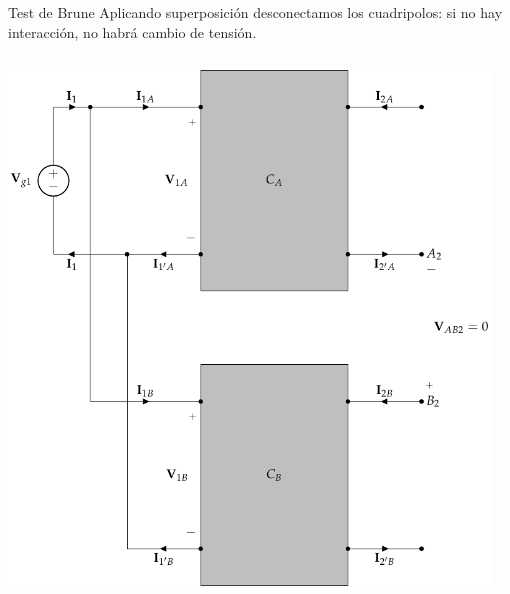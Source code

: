 \documentclass[aspectratio=169, usenames,svgnames,dvipsnames]{beamer}
\begin{document}
\begin{frame}[label={sec:org58fb5cc},plain]{Test de Brune}
Aplicando superposición desconectamos los cuadripolos: \alert{si no hay interacción, no habrá cambio de tensión}.
\begin{columns}
\begin{column}{0.5\columnwidth}
\begin{center}
\includegraphics[height=0.8\textheight]{../figs/paralelo-serie-brune-entrada.pdf}
\end{center}
\end{column}
\begin{column}{0.5\columnwidth}
\begin{center}

\end{center}
\end{column}
\end{columns}
\end{frame}
\end{document}
